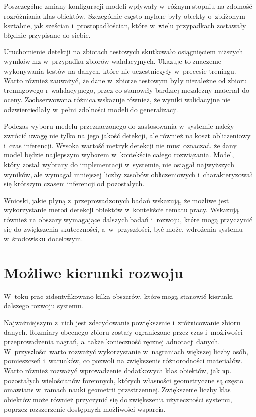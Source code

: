 Poszczególne zmiany konfiguracji modeli wpływały w~różnym stopniu na zdolność rozróżniania klas obiektów. Szczególnie często mylone były obiekty o~zbliżonym kształcie, jak sześcian i~prostopadłościan, które w~wielu przypadkach zostawały błędnie przypisane do siebie.

Uruchomienie detekcji na zbiorach testowych skutkowało osiągnięciem niższych wyników niż w~przypadku zbiorów walidacyjnych. Ukazuje to znaczenie wykonywania testów na danych, które nie uczestniczyły w~procesie treningu. Warto również zauważyć, że dane w~zbiorze testowym były niezależne od zbioru treningowego i~walidacyjnego, przez co stanowiły bardziej niezależny materiał do oceny. Zaobserwowana różnica wskazuje również, że wyniki walidacyjne nie odzwierciedlały w~pełni zdolności modeli do generalizacji.

Podczas wyboru modelu przeznaczonego do zastosowania w~systemie należy zwrócić uwagę nie tylko na jego jakość detekcji, ale również na koszt obliczeniowy i~czas inferencji. Wysoka wartość metryk detekcji nie musi oznaczać, że dany model będzie najlepszym wyborem w~kontekście całego rozwiązania. Model, który został wybrany do implementacji w~systemie, nie osiągał najwyższych wyników, ale wymagał mniejszej liczby zasobów obliczeniowych i~charakteryzował się krótszym czasem inferencji od pozostałych.

Wnioski, jakie płyną z~przeprowadzonych badań wskazują, że możliwe jest wykorzystanie metod detekcji obiektów w~kontekście tematu pracy. Wskazują również na obszary wymagające dalszych badań i~rozwoju, które mogą przyczynić się do zwiększenia skuteczności, a~w~przyszłości, być może, wdrożenia systemu w~środowisku docelowym.

\section{Możliwe kierunki rozwoju}

W~toku prac zidentyfikowano kilka obszarów, które mogą stanowić kierunki dalszego rozwoju systemu.

Najważniejszym z~nich jest zdecydowanie powiększenie i~zróżnicowanie zbioru danych. Rozmiary obecnego zbioru zostały ograniczone przez czas i~możliwości przeprowadzenia nagrań, a~także konieczność ręcznej adnotacji danych. W~przyszłości warto rozważyć wykorzystanie w~nagraniach większej liczby osób, pomieszczeń i~warunków, co pozwoli na zwiększenie różnorodności materiałów. Warto również rozważyć wprowadzenie dodatkowych klas obiektów, jak np. pozostałych wielościanów foremnych, których własności geometryczne są często omawiane w~ramach nauki geometrii przestrzennej. Zwiększenie liczby klas obiektów może również przyczynić się do zwiększenia użyteczności systemu, poprzez rozszerzenie dostępnych możliwości wsparcia.

